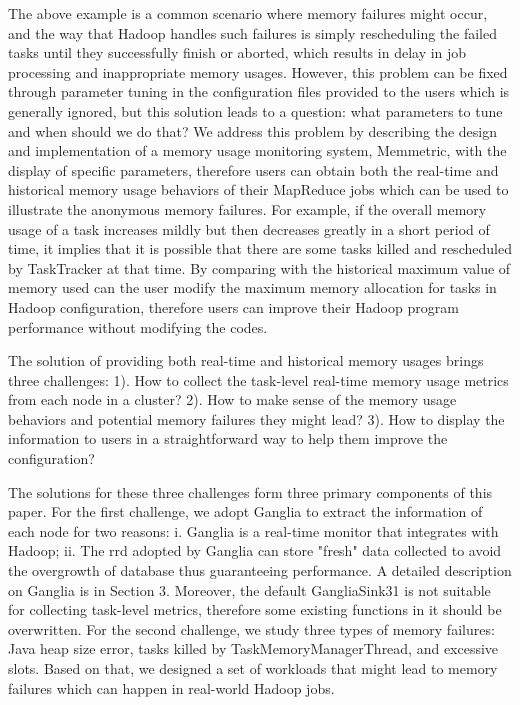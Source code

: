 The above example is a common scenario where memory failures might occur, and the way that Hadoop handles such failures is simply rescheduling the failed tasks until they successfully finish or aborted, which results in delay in job processing and inappropriate memory usages.
However, this problem can be fixed through parameter tuning in the configuration files provided to the users which is generally ignored, but this solution leads to a question: what parameters to tune and when should we do that? 
We address this problem by describing the design and implementation of a memory usage monitoring system, Memmetric, with the display of specific parameters, therefore users can obtain both the real-time and historical memory usage behaviors of their MapReduce jobs which can be used to illustrate the anonymous memory failures.
For example, if the overall memory usage of a task increases mildly but then decreases greatly in a short period of time, it implies that it is possible that there are some tasks killed and rescheduled by TaskTracker at that time.
By comparing with the historical maximum value of memory used can the user modify the maximum memory allocation for tasks in Hadoop configuration, therefore users can improve their Hadoop program performance without modifying the codes.
\par
The solution of providing both real-time and historical memory usages brings three challenges: 1). How to collect the task-level real-time memory usage metrics from each node in a cluster? 2). How to make sense of the memory usage behaviors and potential memory failures they might lead? 3). How to display the information to users in a straightforward way to help them improve the configuration?
\par
The solutions for these three challenges form three primary components of this paper. For the first challenge, we adopt Ganglia to extract the information of each node for two reasons: i. Ganglia is a real-time monitor that integrates with Hadoop; ii. The rrd adopted by Ganglia can store "fresh" data collected to avoid the overgrowth of database thus guaranteeing performance. A detailed description on Ganglia is in Section 3.
Moreover, the default GangliaSink31 is not suitable for collecting task-level metrics, therefore some existing functions in it should be overwritten.
For the second challenge, we study three types of memory failures: Java heap size error, tasks killed by TaskMemoryManagerThread, and excessive slots.
Based on that, we designed a set of workloads that might lead to memory failures which can happen in real-world Hadoop jobs.
